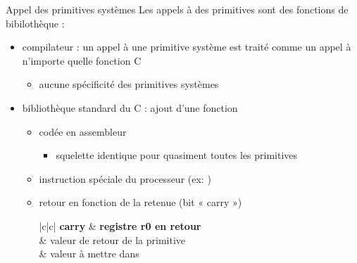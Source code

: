 \begin {frame} {Appel des primitives systèmes}
    Les appels à des primitives sont des fonctions de bibilothèque :
    \begin {itemize}
	\item compilateur : un appel à une primitive
	    système est traité comme un appel à n'importe quelle
	    fonction C

	    \begin {itemize}
		\item aucune spécificité des primitives systèmes
	    \end {itemize}

	\item bibliothèque standard du C : ajout d'une fonction

	    \begin {itemize}
		\item codée en assembleur
		    \begin {itemize}
			\item squelette identique pour quasiment
			    toutes les primitives
		    \end {itemize}
		\item instruction spéciale du processeur (ex: )
		\item retour en fonction de la retenue (bit « carry »)

		    \ctableau {\fD} {|c|c|} {
			\rca \textbf {carry} & \textbf {registre r0 en retour}
			    \\
			 & valeur de retour de la primitive \\
			 & valeur à mettre dans  \\
		    }
	    \end {itemize}
    \end {itemize}
\end {frame}



